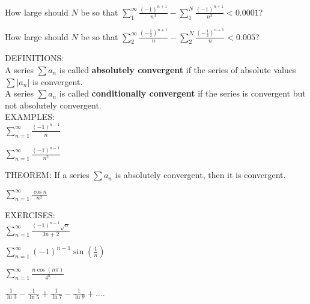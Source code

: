 \documentclass[11pt]{article}
\begin{document}
\vspace{1.5in}

How large should $N$ be so that $\sum_1^{\infty}\frac{(-1)^{n+1}}{n^3}- \sum_1^{N}\frac{(-1)^{n+1}}{n^3} < 0.0001$?

\vspace{1.5in}

How large should $N$ be so that $\sum_2^{\infty}\frac{(-\frac12)^{n+1}}{n}- \sum_2^{N}\frac{(-\frac12)^{n+1}}{n} < 0.005$?

\pagebreak

DEFINITIONS:  \\

A series $\sum a_n$ is called {\bf absolutely convergent} if the series of absolute values $\sum|a_n|$ is convergent.\\

A series $\sum a_n$ is called {\bf conditionally convergent} if the series is convergent but not absolutely convergent.\\

EXAMPLES:\\

$\sum_{n=1}^{\infty} \frac{(-1)^{n-1}}{n}$\quad 

\vspace{1.5in}

$\sum_{n=1}^{\infty} \frac{(-1)^{n-1}}{n^2}$\quad 


\vspace{1.5in}

THEOREM:  If a series $\sum a_n$ is absolutely convergent, then it is convergent.\\

\vspace{.5in}

$\sum_{n=1}^{\infty} \frac{\cos{n}}{n^2}$\quad 

\pagebreak

EXERCISES:\\

$\sum_{n=1}^{\infty} \frac{(-1)^{n-1}\sqrt{n}}{3n+2}$

\vspace{1.8in}

$\sum_{n=1}^{\infty} (-1)^{n-1}\sin{\left( \frac{1}{n} \right)}$

\vspace{1.8in}

$\sum_{n=1}^{\infty} \frac{n\cos{(n\pi)}}{4^n}$

\vspace{1.8in}

$\frac{1}{\ln{3}} - \frac{1}{\ln{5}} + \frac{1}{\ln{7}} - \frac{1}{\ln{9}} + ....$
\end{document}
